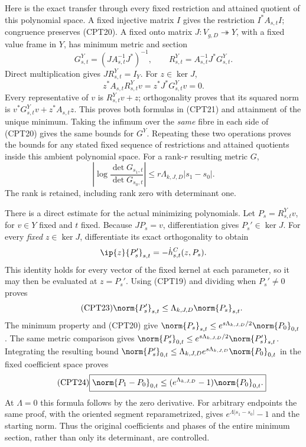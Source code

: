Here is the exact transfer through every fixed restriction and
attained quotient of this polynomial space.  A fixed injective
matrix \(I\) gives the restriction \(I^*A_{s,t}I\); congruence
preserves (CPT20).  A fixed onto matrix
\(J:V_{g,D}\twoheadrightarrow Y\), with a fixed value frame in \(Y\),
has minimum metric and section
\begin{equation}\tag{CPT21}
 G^Y_{s,t}=(J A_{s,t}^{-1}J^*)^{-1},\qquad
 R^Y_{s,t}=A_{s,t}^{-1}J^*G^Y_{s,t}.
\end{equation}
Direct multiplication gives \(JR^Y_{s,t}=I_Y\).
For \(z\in\ker J\),
\[
 z^*A_{s,t}R^Y_{s,t}v=z^*J^*G^Y_{s,t}v=0.
\]
Every representative of \(v\) is \(R^Y_{s,t}v+z\); orthogonality
proves that its squared norm is
\(v^*G^Y_{s,t}v+z^*A_{s,t}z\).
This proves both formulas in (CPT21) and attainment of the unique
minimum.  Taking the infimum over the \emph{same} fibre in each
side of (CPT20) gives the same bounds for \(G^Y\).
Repeating these two operations proves the bounds for any stated
fixed sequence of restrictions and attained quotients inside this
ambient polynomial space.  For a rank-\(r\) resulting metric \(G\),
\begin{equation}\tag{CPT22}
 \left|\log\frac{\det G_{s_1,t}}{\det G_{s_0,t}}\right|
 \le r\Lambda_{k,J,D}|s_1-s_0|.
\end{equation}
The rank is retained, including rank zero with determinant one.

There is a direct estimate for the actual minimizing polynomials.
Let \(P_s=R^Y_{s,t}v\), for \(v\in Y\) fixed and \(t\) fixed.
Because \(JP_s=v\), differentiation gives \(P_s'\in\ker J\).
For every \emph{fixed} \(z\in\ker J\), differentiate its exact
orthogonality to obtain
\[
 \ip{z}{P_s'}_{s,t}=-\dot h^C_{s,t}(z,P_s).
\]
This identity holds for every vector of the fixed kernel at each
parameter, so it may then be evaluated at \(z=P_s'\).
Using (CPT19) and dividing when \(P_s'\ne0\) proves
\begin{equation}\tag{CPT23}
 \norm{P_s'}_{s,t}\le
 \Lambda_{k,J,D}\norm{P_s}_{s,t}.
\end{equation}
The minimum property and (CPT20) give
\(\norm{P_s}_{s,t}\le e^{s\Lambda_{k,J,D}/2}
\norm{P_0}_{0,t}\).
The same metric comparison gives
\(\norm{P_s'}_{0,t}\le e^{s\Lambda_{k,J,D}/2}
\norm{P_s'}_{s,t}\).
Integrating the resulting bound
\(\norm{P_s'}_{0,t}\le
\Lambda_{k,J,D}e^{s\Lambda_{k,J,D}}\norm{P_0}_{0,t}\)
in the fixed coefficient space proves
\begin{equation}\tag{CPT24}
 \boxed{\norm{P_1-P_0}_{0,t}
 \le(e^{\Lambda_{k,J,D}}-1)\norm{P_0}_{0,t}.}
\end{equation}
At \(\Lambda=0\) this formula follows by the zero derivative.
For arbitrary endpoints the same proof, with the oriented segment
reparametrized, gives \(e^{\Lambda|s_1-s_0|}-1\) and the starting
norm.  Thus the original coefficients and phases of the entire
minimum section, rather than only its determinant, are controlled.

